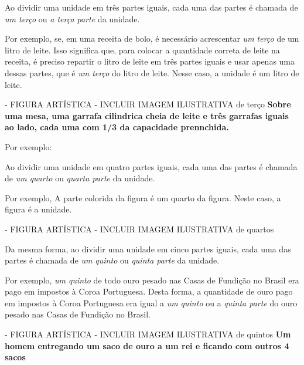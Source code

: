 \documentclass[a4,12pt]{book}
\begin{document}
Ao dividir uma unidade em três partes iguais, cada uma das partes é chamada de {\it um terço} ou {\it a terça parte} da unidade. 

Por exemplo, se, em uma receita de bolo, é necessário acrescentar {\it um terço} de um litro de leite. Isso significa que, para colocar a quantidade correta de leite na receita, é preciso repartir o litro de leite em três partes iguais e usar apenas uma dessas partes, que é {\it um terço} do litro de leite. Nesse caso, a unidade é um litro de leite.

\begin{imagem*}[breakable]{}{}   - FIGURA ARTÍSTICA - INCLUIR IMAGEM ILUSTRATIVA de terço   
  {\bf Sobre uma mesa, uma garrafa cilindrica cheia de leite e três garrafas iguais ao lado, cada uma com 1/3 da capacidade prennchida.}  
  
  Por exemplo:   
  
\end{imagem*}

Ao dividir uma unidade em quatro partes iguais, cada uma das partes é chamada de {\it um quarto} ou {\it quarta parte} da unidade. 

Por exemplo,
A parte colorida da figura é um quarto da figura. Neste caso, a figura é a unidade.


\begin{imagem*}[breakable]{}{}   - FIGURA ARTÍSTICA - INCLUIR IMAGEM ILUSTRATIVA de quartos  
   \end{imagem*}

Da mesma forma, ao dividir uma unidade em cinco partes iguais, cada uma das partes é chamada de {\it um quinto} ou {\it quinta parte} da unidade.

Por exemplo,
{\it um quinto} de todo ouro pesado nas Casas de Fundição no Brasil era pago em impostos à Coroa Portuguesa. Desta forma, a quantidade de ouro pago em impostos à Coroa Portuguesa era igual a {\it um quinto} ou a {\it quinta parte} do ouro pesado nas Casas de Fundição no Brasil.

\begin{imagem*}[breakable]{}{}   - FIGURA ARTÍSTICA - INCLUIR IMAGEM ILUSTRATIVA de quintos   
  {\bf Um homem entregando um saco de ouro a um rei e ficando com outros 4 sacos}  
\end{imagem*}
\end{document}
